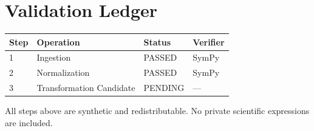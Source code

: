 \section{Validation Ledger}

\begin{tabular}{|l|l|l|l|}
\hline
\textbf{Step} & \textbf{Operation} & \textbf{Status} & \textbf{Verifier} \\
\hline
1 & Ingestion & PASSED & SymPy \\
2 & Normalization & PASSED & SymPy \\
3 & Transformation Candidate & PENDING & — \\
\hline
\end{tabular}

All steps above are synthetic and redistributable. No private
scientific expressions are included.
